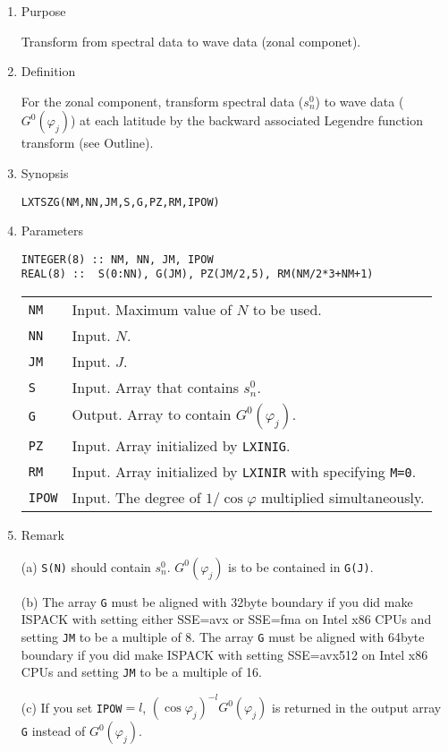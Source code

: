 \documentclass[a4paper]{scrartcl}
\begin{document}
\begin{enumerate}

\item Purpose 

Transform from spectral data to wave data (zonal componet).

\item Definition

For the zonal component, transform spectral data ($s^0_n$) 
to wave data ($G^0(\varphi_j)$) at each latitude
by the backward associated Legendre function transform (see Outline).

\item Synopsis 

\texttt{LXTSZG(NM,NN,JM,S,G,PZ,RM,IPOW)}
  
\item Parameters

\begin{verbatim}  
INTEGER(8) :: NM, NN, JM, IPOW
REAL(8) ::  S(0:NN), G(JM), PZ(JM/2,5), RM(NM/2*3+NM+1)
\end{verbatim}  

\begin{tabular}{ll}
\texttt{NM} & Input. Maximum value of $N$ to be used.\\
\texttt{NN} & Input. $N$.\\
\texttt{JM} & Input. $J$.\\
\texttt{S} & Input. Array that contains $s^0_n$.\\
\texttt{G} & Output. Array to contain $G^0(\varphi_j)$.\\
\texttt{PZ}  & Input. Array initialized by \texttt{LXINIG}.\\
\texttt{RM} & Input. Array initialized by \texttt{LXINIR}
with specifying \texttt{M=0}.\\
\texttt{IPOW} & Input. 
The degree of $1/\cos\varphi$ multiplied 
simultaneously.
\end{tabular}

\item Remark

(a) \texttt{S(N)} should 
contain $s^0_n$. $G^0(\varphi_j)$
is to be contained in \texttt{G(J)}.

(b) The array \texttt{G} must be aligned with 32byte boundary
if you did make ISPACK with setting either SSE=avx or SSE=fma
on Intel x86 CPUs and setting \texttt{JM} to be a multiple of 8.
The array \texttt{G} must be aligned with 64byte boundary
if you did make ISPACK with setting SSE=avx512
on Intel x86 CPUs and setting \texttt{JM} to be a multiple of 16.

(c) If you set \texttt{IPOW}$=l$, 
$(\cos\varphi_j)^{-l}G^0(\varphi_j)$ is returned 
in the output array \texttt{G} instead of $G^0(\varphi_j)$.

\end{enumerate}
\end{document}
